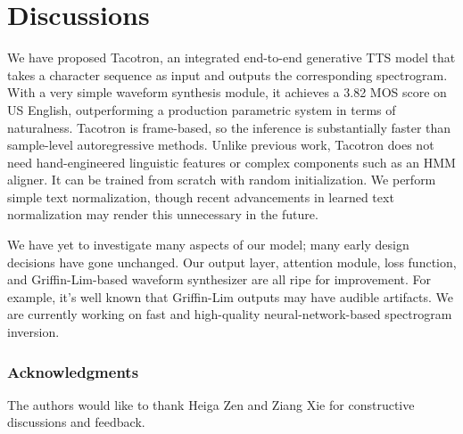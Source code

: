 \documentclass{article} \usepackage{iclr2017_conference,times}
\begin{document}
\section{Discussions}
We have proposed Tacotron, an integrated end-to-end generative TTS model that takes a character sequence as input and outputs the corresponding spectrogram. With a very simple waveform synthesis module, it achieves a 3.82 MOS score on US English, outperforming a production parametric system in terms of naturalness. Tacotron is frame-based, so the inference is substantially faster than sample-level autoregressive methods. Unlike previous work, Tacotron does not need hand-engineered linguistic features or complex components such as an HMM aligner. It can be trained from scratch with random initialization. We perform simple text normalization, though recent advancements in learned text normalization \citep{sproat2016rnn} may render this unnecessary in the future.

We have yet to investigate many aspects of our model; many early design decisions have gone unchanged. Our output layer, attention module, loss function, and Griffin-Lim-based waveform synthesizer are all ripe for improvement. For example, it's well known that Griffin-Lim outputs may have audible artifacts. We are currently working on fast and high-quality neural-network-based spectrogram inversion.


\subsubsection*{Acknowledgments}
The authors would like to thank Heiga Zen and Ziang Xie for constructive discussions and feedback.



\end{document}
